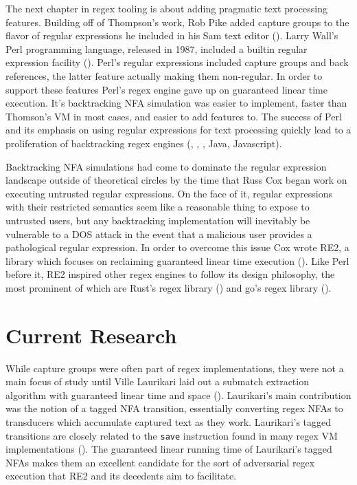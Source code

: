 The next chapter in regex tooling is about adding pragmatic text
processing features. Building off of Thompson's work,
Rob Pike added capture groups to the flavor of regular expressions
he included in his Sam text editor (\cite{Pike1987}). Larry Wall's
Perl programming language, released in 1987, included a builtin
regular expression facility (\cite{Perl}). Perl's regular
expressions included capture groups and back references, the
latter feature actually making them non-regular. In order to
support these features Perl's regex engine gave up on guaranteed
linear time execution. It's backtracking NFA
simulation was easier to implement, faster than Thomson's VM in most
cases, and easier to add features to. The success of Perl and its
emphasis on using regular expressions for text processing quickly
lead to a proliferation of backtracking regex engines (\cite{PCRE},
\cite{PCRE2}, \cite{Python}, Java, Javascript).

Backtracking NFA simulations had come to dominate the regular
expression landscape outside of theoretical circles by the
time that Russ Cox began work on executing untrusted regular
expressions. On the face of it, regular expressions with their
restricted semantics seem like a reasonable thing to expose to
untrusted users, but any backtracking implementation will inevitably
be vulnerable to a DOS attack in the event that a malicious user
provides a pathological regular expression. In order to
overcome this issue Cox wrote RE2, a library
which focuses on reclaiming guaranteed linear time execution (\cite{CoxRE2}).
Like Perl before it, RE2 inspired other regex engines to
follow its design philosophy, the most prominent of which are
Rust's regex library (\cite{GallantRegex}) and go's regex library
(\cite{GoLang}).

\section{Current Research}

While capture groups were often part of regex implementations,
they were not a main focus of study until Ville Laurikari laid
out a submatch extraction algorithm with guaranteed linear time
and space (\cite{Laurikari2001}). Laurikari's main contribution
was the notion of a tagged NFA transition, essentially converting
regex NFAs to transducers which accumulate captured text as they
work. Laurikari's tagged transitions are closely related to the
\verb'save' instruction found in many regex VM implementations
(\cite{CoxVirtualMachineApproach}). The guaranteed linear
running time of Laurikari's tagged NFAs makes them an excellent
candidate for the sort of adversarial regex execution that RE2
and its decedents aim to facilitate.

